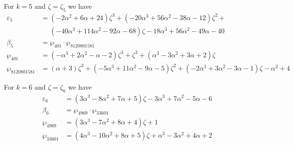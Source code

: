 \documentclass[12pt]{amsart}
\theoremstyle{definition}
\def\a{\alpha}
\def\z{\zeta}
\def\z{\zeta}
\begin{document}
\noindent 
For $k=5$ and $\zeta=\zeta_5$ we have
{\small
\begin{align*}
\varepsilon_{5} &= 
(-2 \a^2 + 6 \a + 24) \z^3 + (-20 \a^3 + 56 \a^2 - 38 \a - 12) \z^2 + 
\\ & \quad\,\,
(-40 \a^3 + 114 \a^2 - 92 \a - 68) \z - 18 \a^3 + 56 \a^2 - 49 \a - 40
\\
\beta_{5} &= \wp_{401} \cdot \wp_{8120801581}  \\
\wp_{401} &=
(-\a^3 + 2 \a^2 - \a - 2) \z^3 + \z^2 + (\a^3 - 3 \a^2 + 3 \a + 2) \z
\\
\wp_{8120801581} &=
(\a + 3) \z^3 + (-5 \a^3 + 11 \a^2 - 9 \a - 5) \z^2 + (-2 \a^3 + 3 \a^2 - 3 \a - 1) \z - \a^2 + 4
\end{align*}
}

\noindent 
For $k=6$ and $\zeta=\zeta_6$ we have
{\small
\begin{align*}
\varepsilon_{6} &= 
(3 \a^3 - 8 \a^2 + 7 \a + 5) \z - 3 \a^3 + 7 \a^2 - 5 \a - 6
\\
\beta_{6} &= \wp_{4969} \cdot \wp_{33601}  \\
\wp_{4969} &= (3 \a^3 - 7 \a^2 + 8 \a + 4) \z + 1
\\
\wp_{33601} &= (4 \a^3 - 10 \a^2 + 8 \a + 5) \z + \a^3 - 3 \a^2 + 4 \a + 2
\end{align*}
}
\end{document}
